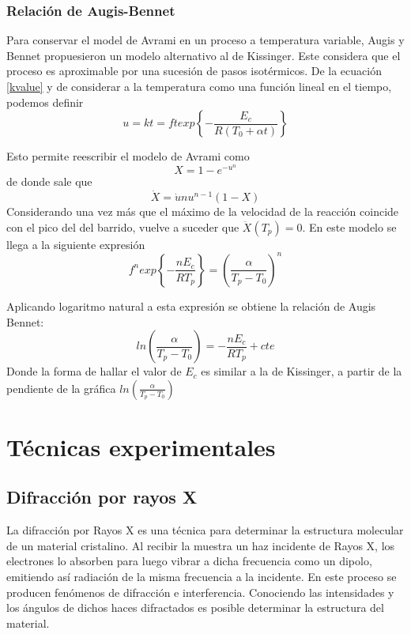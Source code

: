 \documentclass[12pt]{article}
\theoremstyle{definition}
\theoremstyle{remark}
\begin{document}
\subsubsection{Relación de Augis-Bennet}
Para conservar el model de Avrami en un proceso a temperatura variable, Augis y Bennet propuesieron un modelo alternativo al de Kissinger. Este considera que el proceso es aproximable por una sucesión de pasos isotérmicos.
De la ecuación \ref{kvalue} y de considerar a la temperatura como una función lineal en el tiempo, podemos definir
\begin{equation}
	u = kt = ft exp \left\lbrace -\frac{E_c}{R(T_0 + \alpha t)} \right\rbrace
\end{equation}

Esto permite reescribir el modelo de Avrami como 
\begin{equation}
	X = 1-e^{-u^{n}}
\end{equation}
de donde sale que
\begin{equation}
	\dot{X} = \dot{u}nu^{n-1}(1-X)
\end{equation}
Considerando una vez más que el máximo de la velocidad de la reacción coincide con el pico del del barrido, vuelve a suceder que $\ddot{X}(T_p) = 0$. En este modelo se llega a la siguiente expresión
\begin{equation}
	f^n exp \left\lbrace -\frac{n E_c}{RT_p} \right\rbrace = (\frac{\alpha}{T_p - T_0})^n
\end{equation}

Aplicando logaritmo natural a esta expresión se obtiene la relación de Augis Bennet:
\begin{equation}
	ln(\frac{\alpha}{T_p - T_0}) = -\frac{n E_c}{RT_p} + cte
\end{equation}
Donde la forma de hallar el valor de $E_c$ es similar a la de Kissinger, a partir de la pendiente de la gráfica $ln(\frac{\alpha}{T_p - T_0})$

\section{Técnicas experimentales}

\subsection{Difracción por rayos X}
 La difracción por Rayos X es una técnica para determinar la estructura molecular de un material cristalino. Al recibir la muestra un haz incidente de Rayos X, los electrones lo absorben para luego vibrar a dicha frecuencia como un dipolo, emitiendo así radiación de la misma frecuencia a la incidente. En este proceso se producen fenómenos de difracción e interferencia.  Conociendo las intensidades y los ángulos de dichos haces difractados es posible determinar la estructura del material.
 
\end{document}
